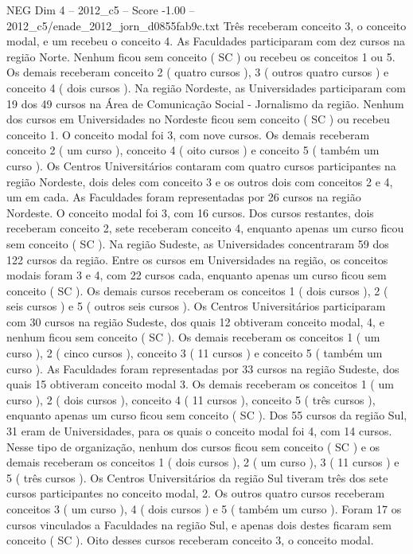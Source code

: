 \begin{textsample}{NEG Dim 4 – 2012\_c5 – Score -1.00 – 2012\_c5/enade\_2012\_jorn\_d0855fab9c.txt}
Três receberam conceito 3, o conceito modal, e um recebeu o conceito 4.
As Faculdades participaram com dez cursos na região Norte.
Nenhum ficou sem conceito ( SC ) ou recebeu os conceitos 1 ou 5.
Os demais receberam conceito 2 ( quatro cursos ), 3 ( outros quatro cursos ) e conceito 4 ( dois cursos ).
Na região Nordeste, as Universidades participaram com 19 dos 49 cursos na Área de Comunicação Social - Jornalismo da região.
Nenhum dos cursos em Universidades no Nordeste ficou sem conceito ( SC ) ou recebeu conceito 1.
O conceito modal foi 3, com nove cursos.
Os demais receberam conceito 2 ( um curso ), conceito 4 ( oito cursos ) e conceito 5 ( também um curso ).
Os Centros Universitários contaram com quatro cursos participantes na região Nordeste, dois deles com conceito 3 e os outros dois com conceitos 2 e 4, um em cada.
As Faculdades foram representadas por 26 cursos na região Nordeste.
O conceito modal foi 3, com 16 cursos.
Dos cursos restantes, dois receberam conceito 2, sete receberam conceito 4, enquanto apenas um curso ficou sem conceito ( SC ).
Na região Sudeste, as Universidades concentraram 59 dos 122 cursos da região.
Entre os cursos em Universidades na região, os conceitos modais foram 3 e 4, com 22 cursos cada, enquanto apenas um curso ficou sem conceito ( SC ).
Os demais cursos receberam os conceitos 1 ( dois cursos ), 2 ( seis cursos ) e 5 ( outros seis cursos ).
Os Centros Universitários participaram com 30 cursos na região Sudeste, dos quais 12 obtiveram conceito modal, 4, e nenhum ficou sem conceito ( SC ).
Os demais receberam os conceitos 1 ( um curso ), 2 ( cinco cursos ), conceito 3 ( 11 cursos ) e conceito 5 ( também um curso ).
As Faculdades foram representadas por 33 cursos na região Sudeste, dos quais 15 obtiveram conceito modal 3.
Os demais receberam os conceitos 1 ( um curso ), 2 ( dois cursos ), conceito 4 ( 11 cursos ), conceito 5 ( três cursos ), enquanto apenas um curso ficou sem conceito ( SC ).
Dos 55 cursos da região Sul, 31 eram de Universidades, para os quais o conceito modal foi 4, com 14 cursos.
Nesse tipo de organização, nenhum dos cursos ficou sem conceito ( SC ) e os demais receberam os conceitos 1 ( dois cursos ), 2 ( um curso ), 3 ( 11 cursos ) e 5 ( três cursos ).
Os Centros Universitários da região Sul tiveram três dos sete cursos participantes no conceito modal, 2.
Os outros quatro cursos receberam conceitos 3 ( um curso ), 4 ( dois cursos ) e 5 ( também um curso ).
Foram 17 os cursos vinculados a Faculdades na região Sul, e apenas dois destes ficaram sem conceito ( SC ).
Oito desses cursos receberam conceito 3, o conceito modal.

\end{textsample}
